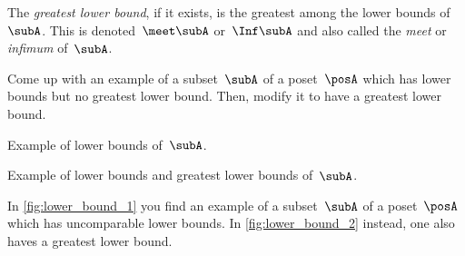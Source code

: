 \begin{ctdefinition}
    The \emph{greatest lower bound}, if it exists, is the greatest among the lower bounds of~$\subA$.
    This is denoted~$\meet \subA$ or~$\Inf \subA$ and also called the \emph{meet} or \emph{infimum} of~$\subA$.
\end{ctdefinition}

\begin{exercise}
    Come up with an example of a subset~$\subA$ of a poset~$\posA$ which has lower bounds but no greatest lower bound.
    Then, modify it to have a greatest lower bound.
\end{exercise}

\begin{solution}
    \begin{marginfigure}
        \centering
        \caption{Example of lower bounds of~$\subA$. \label{fig:lower_bound_1}}
    \end{marginfigure}
    \begin{marginfigure}
        \centering
        \caption{Example of lower bounds and greatest lower bounds of~$\subA$. \label{fig:lower_bound_2}}
    \end{marginfigure}

    In \cref{fig:lower_bound_1} you find an example of a subset~$\subA$ of a poset~$\posA$ which has uncomparable lower bounds.
    In \cref{fig:lower_bound_2} instead, one also haves a greatest lower bound.
\end{solution}
